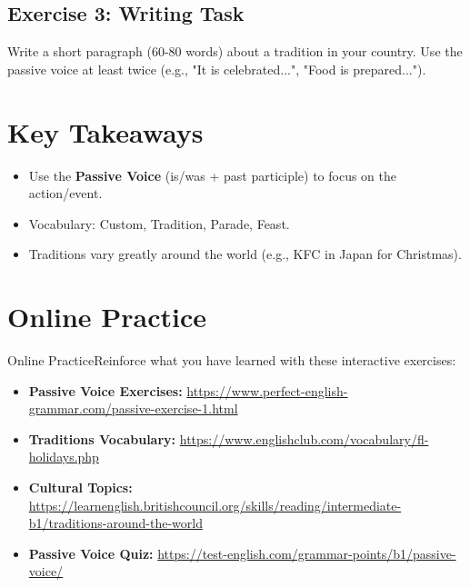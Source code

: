\subsection{Exercise 3: Writing Task}
Write a short paragraph (60-80 words) about a tradition in your country. Use the passive voice at least twice (e.g., "It is celebrated...", "Food is prepared...").

\begin{tcolorbox}[colback=white,height=5cm]
\end{tcolorbox}

\section{Key Takeaways}
\begin{itemize}
    \item Use the \textbf{Passive Voice} (is/was + past participle) to focus on the action/event.
    \item Vocabulary: Custom, Tradition, Parade, Feast.
    \item Traditions vary greatly around the world (e.g., KFC in Japan for Christmas).
\end{itemize}

\section{Online Practice}
\begin{tcolorbox}[colback=blue!5,colframe=blue!40!black,title=Resources to Practice]
Online PracticeReinforce what you have learned with these interactive exercises:
\begin{itemize}
    \item \textbf{Passive Voice Exercises:} \url{https://www.perfect-english-grammar.com/passive-exercise-1.html}
    \item \textbf{Traditions Vocabulary:} \url{https://www.englishclub.com/vocabulary/fl-holidays.php}
    \item \textbf{Cultural Topics:} \url{https://learnenglish.britishcouncil.org/skills/reading/intermediate-b1/traditions-around-the-world}
    \item \textbf{Passive Voice Quiz:} \url{https://test-english.com/grammar-points/b1/passive-voice/}
\end{itemize}
\end{tcolorbox}
